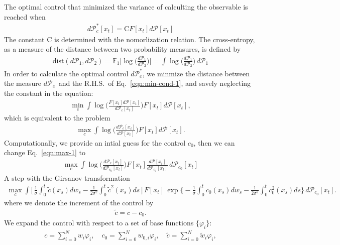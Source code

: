 \documentclass[aip,jcp,a4paper,reprint,onecolumn]{revtex4-1}
\newcommand{\pathmeas}{d\mathcal P}
\newcommand{\dist}{\textrm{dist}}
\begin{document}
\noindent
The optimal control that minimized the variance of calculting the observable is reached when
\begin{align}\label{eqn:min-cond-1}
  \pathmeas_c^\ast[x_t] =\textrm{C} F[x_t] \pathmeas[x_t]
\end{align}
The constant \textrm{C} is determined with the nomorlization relation.
The cross-entropy, as a measure of the distance between two
probability measures, is defined by
\begin{align}
  \dist(\pathmeas_1, \pathmeas_2)
  = \mathbb E_1 \Big[\log \Big(\frac{\pathmeas_1}{\pathmeas_2}\Big)\Big]
  = \int \log \Big(\frac{\pathmeas_1}{\pathmeas_2}\Big)\, \pathmeas_1
\end{align}
In order to calculate the optimal control $\pathmeas_c^\ast$, we
minmize the distance between the measure $\pathmeas_c$~and the
R.H.S.~of Eq.~\eqref{eqn:min-cond-1}, and savely neglecting the
constant in the equation:
\begin{align}
  \min_c \int  \log \Big( \frac{F[x_t]\pathmeas[x_t]}{\pathmeas_c[x_t]} \Big) F[x_t]\pathmeas[x_t],
\end{align}
which is equivalent to the problem
\begin{align}\label{eqn:max-1}
  \max_c \int \log \Big(\frac{\pathmeas_c[x_t]}{\pathmeas[x_t]} \Big) F[x_t]\pathmeas[x_t].
\end{align}
Computationally, we provide an intial guess for the control $c_0$, then we can change Eq.~\eqref{eqn:max-1} to
\begin{align}
  \max_c \int
  \log \Big(\frac{\pathmeas_c[x_t]}{\pathmeas_{c_0}[x_t]} \Big)
  F[x_t]
  \frac{\pathmeas[x_t]}{\pathmeas_{c_0}[x_t]}
  \,\pathmeas_{c_0}[x_t]
\end{align}
A step with the Girsanov transformation
\begin{align}
  \max_c \int
  \Big[\, \frac1\sigma\int_0^t\tilde c(x_s) dw_s - \frac 1{2\sigma^2} \int_0^t\tilde c^2(x_s) ds \,\Big]
  \,F[x_t]\,
  \exp
  \Big\{ -\frac1\sigma\int_0^t c_0(x_s) dw_s - \frac 1{2\sigma^2} \int_0^t c_0^2(x_s) ds \Big \}
  \,\pathmeas_{c_0}[x_t].
\end{align}
where we denote the increment of the control by
\begin{align}
  \tilde c = c - c_0.
\end{align}
We expand the control with respect to a set of base functions $\{\varphi_i\}$:
\begin{align}
  c = \sum_{i=0}^N w_i\varphi_i, \quad c_0 = \sum_{i=0}^N w_{0,i}\varphi_i, \quad \tilde c = \sum_{i=0}^N \tilde w_i\varphi_i,
\end{align}
\end{document}
